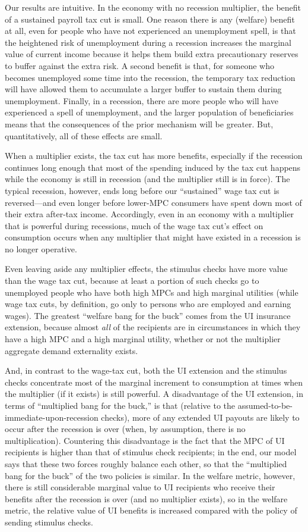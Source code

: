 \documentclass[\econtexRoot/HAFiscal]{subfiles}
\begin{document}
Our results are intuitive. In the economy with no recession multiplier, the benefit of a sustained payroll tax cut is small.  One reason there is any (welfare) benefit at all, even for people who have not experienced an unemployment spell, is that the heightened risk of unemployment during a recession increases the marginal value of current income because it helps them build extra precautionary reserves to buffer against the extra risk.  A second benefit is that, for someone who becomes unemployed some time into the recession, the temporary tax reduction will have allowed them to accumulate a larger buffer to sustain them during unemployment.  Finally, in a recession, there are more people who will have experienced a spell of unemployment, and the larger population of beneficiaries means that the consequences of the prior mechanism will be greater.  But, quantitatively, all of these effects are small.

When a multiplier exists, the tax cut has more benefits, especially if the recession continues long enough that most of the spending induced by the tax cut happens while the economy is still in recession (and the multiplier still is in force).  The typical recession, however, ends long before our ``sustained'' wage tax cut is reversed---and even longer before lower-MPC consumers have spent down most of their extra after-tax income. Accordingly, even in an economy with a multiplier that is powerful during recessions, much of the wage tax cut's effect on consumption occurs when any multiplier that might have existed in a recession is no longer operative.

Even leaving aside any multiplier effects, the stimulus checks have more value than the wage tax cut, because at least a portion of such checks go to unemployed people who have both high MPCs and high marginal utilities (while wage tax cuts, by definition, go only to persons who are employed and earning wages). The greatest ``welfare bang for the buck'' comes from the UI insurance extension, because almost \textit{all} of the recipients are in circumstances in which they have a high MPC and a high marginal utility, whether or not the multiplier aggregate demand externality exists.

And, in contrast to the wage-tax cut, both the UI extension and the stimulus checks concentrate most of the marginal increment to consumption at times when the multiplier (if it exists) is still powerful.  A disadvantage of the UI extension, in terms of ``multiplied bang for the buck,'' is that (relative to the assumed-to-be-immediate-upon-recession checks), more of any extended UI payouts are likely to occur after the recession is over (when, by assumption, there is no multiplication).  Countering this disadvantage is the fact that the MPC of UI recipients is higher than that of stimulus check recipients; in the end, our model says that these two forces roughly balance each other, so that the ``multiplied bang for the buck'' of the two policies is similar.  In the welfare metric, however, there is still considerable marginal value to UI recipients who receive their benefits after the recession is over (and no multiplier exists), so in the welfare metric, the relative value of UI benefits is increased compared with the policy of sending stimulus checks.
\end{document}
